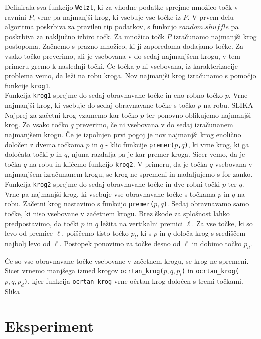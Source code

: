 \documentclass[a4paper]{article}
\begin{document}
Definirala sva funkcijo \texttt{Welzl}, ki za vhodne podatke sprejme množico točk v ravnini $P$, vrne pa najmanjši krog, ki vsebuje vse točke iz $P$. 
V prvem delu algoritma poskrbiva za pravilen tip podatkov, s funkcijo $random.shuffle$ pa poskrbiva za naključno izbiro točk.
Za množico točk $P$ izračunamo najmanjši krog postopoma. Začnemo s prazno množico, ki ji zaporedoma dodajamo točke. Za vsako točko preverimo, ali je vsebovana v do sedaj najmanjšem krogu, v tem primeru gremo k naslednji točki. Če točka $p$ ni vsebovana, iz karakterizacije problema vemo, da leži na robu kroga. Nov najmanjši krog izračunamo s pomočjo funkcije \texttt{krog1}.\\ 
Funkcija \texttt{krog1} sprejme do sedaj obravnavane točke in eno robno točko $p$. Vrne najmanjši krog, ki vsebuje do sedaj obravnavane točke s točko $p$ na robu. 
SLIKA\\
Najprej za začetni krog vzamemo kar točko $p$ ter ponovno oblikujemo najmanjši krog. Za vsako točko $q$ preverimo, če ni vsebovana v do sedaj izračunanem najmanjšem krogu. Če je izpolnjen prvi pogoj je nov najmanjši krog enolično določen z dvema točkama $p$ in $q$ - klic funkcije \texttt{premer($p$,$q$)}, ki vrne krog, ki ga določata točki $p$ in $q$, njuna razdalja pa je kar premer kroga. Sicer vemo, da je točka $q$ na robu in kličemo funkcijo \texttt{krog2}. V primeru, da je točka $q$ vsebovana v najmanjšem izračunanem krogu, se krog ne spremeni in nadaljujemo s for zanko.
Funkcija \texttt{krog2} sprejme do sedaj obravnavane točke in dve robni točki $p$ ter $q$. Vrne pa najmanjši krog, ki vsebuje vse obravnavane točke s točkama $p$ in $q$ na robu. Začetni krog nastavimo s funkcijo \texttt{premer($p,q$)}.  Sedaj obravnavamo samo točke, ki niso vsebovane v začetnem krogu.
Brez škode za splošnost lahko predpostavimo, da točki $p$ in $q$ ležita na vertikalni premici $\ell$. Za vse točke, ki so levo od premice $\ell$, poiščemo tisto točko $p_l$, ki s $p$ in $q$ določa krog s središčem najbolj levo od $\ell$. Postopek ponovimo za točke desno od $\ell$ in dobimo točko $p_d$. 

Če so vse obravnavane točke vsebovane v začetnem krogu, se krog ne spremeni. Sicer vrnemo manjšega izmed krogov \texttt{ocrtan\_krog($p,q,p_l$)} in \texttt{ocrtan\_krog($p,q,p_d$)}, kjer funkcija \texttt{ocrtan\_krog} vrne očrtan krog določen s tremi točkami.
Slika

\section{Eksperiment}
\end{document}

